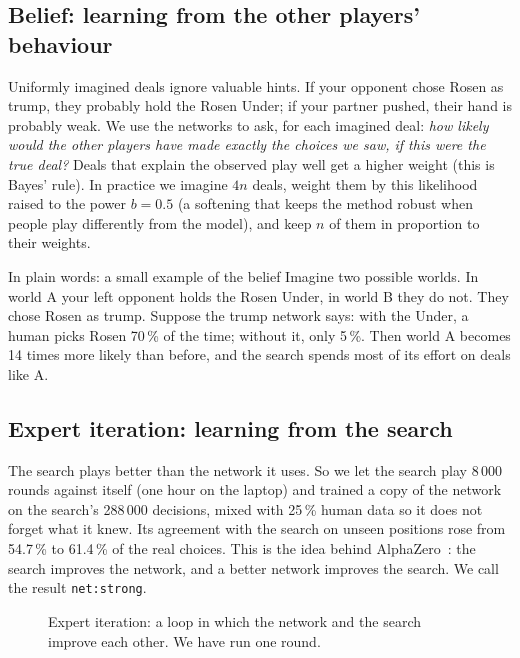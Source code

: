 \documentclass[10pt,a4paper]{article}
\begin{document}
\subsection{Belief: learning from the other players' behaviour}\label{sec:belief}
Uniformly imagined deals ignore valuable hints. If your opponent chose Rosen as trump, they probably hold the Rosen
Under; if your partner pushed, their hand is probably weak. We use the networks to ask, for each imagined deal:
\emph{how likely would the other players have made exactly the choices we saw, if this were the true deal?} Deals that
explain the observed play well get a higher weight (this is Bayes' rule). In practice we imagine $4n$ deals, weight
them by this likelihood raised to the power $b=0.5$ (a softening that keeps the method robust when people play
differently from the model), and keep $n$ of them in proportion to their weights.

\begin{plain}{In plain words: a small example of the belief}
Imagine two possible worlds. In world A your left opponent holds the Rosen Under, in world B they do not. They chose
Rosen as trump. Suppose the trump network says: with the Under, a human picks Rosen 70\,\% of the time; without it,
only 5\,\%. Then world A becomes 14 times more likely than before, and the search spends most of its effort on deals
like A.
\end{plain}

\subsection{Expert iteration: learning from the search}\label{sec:expit}
The search plays better than the network it uses. So we let the search play 8\,000 rounds against itself (one hour on
the laptop) and trained a copy of the network on the search's 288\,000 decisions, mixed with 25\,\% human data so it
does not forget what it knew. Its agreement with the search on unseen positions rose from 54.7\,\% to 61.4\,\% of the
real choices. This is the idea behind AlphaZero~\cite{alphazero}: the search improves the network, and a better network
improves the search. We call the result \texttt{net:strong}.

\begin{figure}[h]
\centering
{}
\caption{Expert iteration: a loop in which the network and the search improve each other. We have run one round.}
\end{figure}
\end{document}
